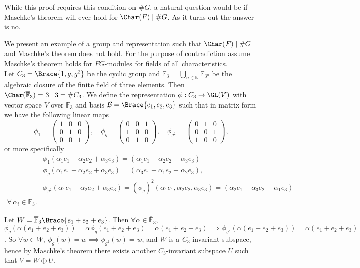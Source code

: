 \documentclass[../Project.tex]{subfiles}
\begin{document}
	While this proof requires this condition on $\#G$, a  natural question would be if Maschke's theorem will ever hold for $\Char(F) \mid \#G$. As it turns out the answer is no.

\begin{exam}
	We present an example of a group and representation such that $\Char(F) \mid \#{G}$ and Maschke's theorem does not hold. For the purpose of contradiction assume Maschke's theorem holds for $FG$-modules for fields of all characteristics.\\

	Let $C_3 = \Brace{1, g, g^2}$ be the cyclic group and $\overline{\mathbb{F}}_3 = \bigcup\limits_{n \in \mathbb{N}}\mathbb{F}_{3^n}$ be the algebraic closure of the finite field of three elements. Then $\Char(\overline{\mathbb{F}}_3) = 3\mid 3 = \# C_3$.
	We define the representation $\phi : C_3 \to \GL(V)$ with vector space $V$ over $\overline{\mathbb{F}}_3$ and basis $\mathcal{B} = \Brace{e_1,e_2,e_3}$ such that in matrix form we have the following linear maps
	$$\phi_1 = \begin{pmatrix}1 & 0 & 0\\0 & 1 & 0 \\0 & 0 & 1\end{pmatrix},\quad \phi_g = \begin{pmatrix}0 & 0 & 1\\1 & 0 & 0\\0 & 1 & 0\end{pmatrix},\quad \phi_{g^2} = \begin{pmatrix}0 & 1 & 0\\0 & 0 & 1\\1 & 0 & 0\end{pmatrix},$$
	or more specifically
	\begin{align*}
	&\phi_1(\alpha_1e_1 + \alpha_2e_2 + \alpha_3e_3) = (\alpha_1e_1+\alpha_2e_2 + \alpha_3e_3)\\
	&\phi_g(\alpha_1e_1+\alpha_2e_2+\alpha_3e_3) = (\alpha_3e_1+\alpha_1e_2+\alpha_2e_3),\\
	&\phi_{g^2}(\alpha_1e_1 + \alpha_2e_2 + \alpha_3e_3) = (\phi_g)^2(\alpha_1e_1,\alpha_2e_2,\alpha_3e_3) = (\alpha_2e_1 + \alpha_3e_2 + \alpha_1e_3)\\
	\forall\,\alpha_i \in \overline{\mathbb{F}}_3.
	\end{align*}

	Let $W = \overline{\mathbb{F}}_3\Brace{e_1+e_2+e_3}$. Then $\forall \alpha \in \overline{\mathbb{F}}_3$, $\phi_g(\alpha(e_1 + e_2 + e_3)) = \alpha\phi_g(e_1 + e_2 + e_3) = \alpha(e_1 + e_2 + e_3) \implies \phi_{g^2}(\alpha(e_1 + e_2 + e_3)) = \alpha(e_1 + e_2 + e_3)$. So $\forall w \in W$, $\phi_g(w) = w \implies \phi_{g^2}(w) = w$, and $W$ is a $C_3$-invariant subspace, hence by Maschke's theorem there exists another $C_3$-invariant subspace $U$ such that $V = W \oplus U$.\\


\end{exam}
\end{document}
